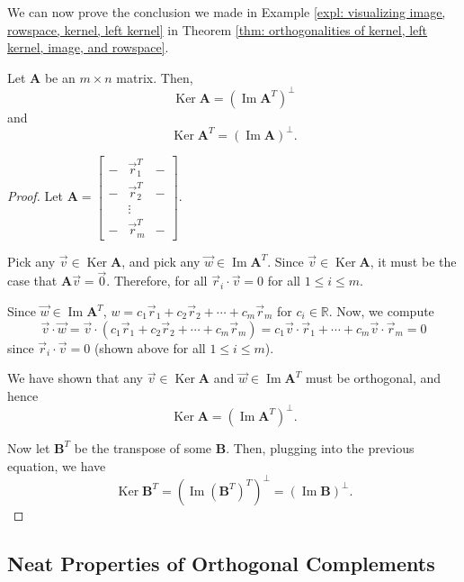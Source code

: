 \documentclass[]{book}
\DeclareMathOperator{\image}{Im}
\DeclareMathOperator{\kernel}{Ker}
\newcommand{\mat}[1]{\ensuremath{\mathbf{#1}}}
\newcommand{\R}{\ensuremath{\mathbb{R}}}
\begin{document}
We can now prove the conclusion we made in Example \ref{expl: visualizing image, rowspace, kernel, left kernel} in Theorem \ref{thm: orthogonalities of kernel, left kernel, image, and rowspace}.

\begin{theorem}
    \label{thm: orthogonalities of kernel, left kernel, image, and rowspace}
    Let $\mat{A}$ be an $m \times n$ matrix. Then, 
    \[\kernel\mat{A} = \left(\image\mat{A}^T\right)^{\perp}\]
    and
    \[\kernel\mat{A}^T = \left(\image\mat{A}\right)^{\perp}.\]
\begin{proof}
    Let $\mat{A} = \begin{bmatrix} - & \vec{r}_1^T & - \\ - & \vec{r}_2^T & - \\ &\vdots& \\ - & \vec{r}_m^T & -\end{bmatrix}$. 
    
    Pick any $\vec{v} \in \kernel\mat{A}$, and pick any $\vec{w} \in \image\mat{A}^T$. Since $\vec{v} \in \kernel\mat{A}$, it must be the case that $\mat{A}\vec{v} = \vec{0}$. Therefore, for all $\vec{r}_i \cdot \vec{v} = 0$ for all $1 \leq i \leq m$.
    
    Since $\vec{w} \in \image\mat{A}^T$, $w = c_1\vec{r}_1 + c_2\vec{r}_2 + \cdots + c_m\vec{r}_m$ for $c_i \in \R$. Now, we compute
    \[\vec{v} \cdot \vec{w} = \vec{v} \cdot (c_1\vec{r}_1 + c_2\vec{r}_2 + \cdots + c_m\vec{r}_m) = c_1\vec{v}\cdot\vec{r}_1 + \cdots + c_m\vec{v}\cdot\vec{r}_m = 0\] since $\vec{r}_i \cdot \vec{v} = 0$ (shown above for all $1 \leq i \leq m$). 
    
    We have shown that any $\vec{v} \in \kernel\mat{A}$ and $\vec{w} \in \image\mat{A}^T$ must be orthogonal, and hence \[\kernel\mat{A} = \left(\image\mat{A}^T\right)^{\perp}.\]
    
    Now let $\mat{B}^T$ be the transpose of some $\mat{B}$. Then, plugging into the previous equation, we have
    \[\kernel\mat{B}^T = \left(\image\left(\mat{B}^T\right)^T\right)^{\perp} = \left(\image\mat{B}\right)^{\perp}.\]
\end{proof}
\end{theorem}

\subsection{Neat Properties of Orthogonal Complements}
\end{document}
